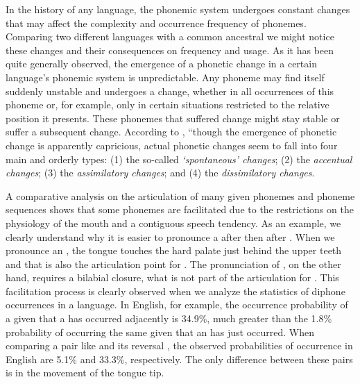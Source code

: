 In the history of any language, the phonemic system undergoes constant changes that may affect the complexity and occurrence frequency of phonemes. Comparing two different languages with a common ancestral we might notice these changes and their consequences on frequency and usage. As it has been quite generally observed, the emergence of a phonetic change in a certain language's phonemic system is unpredictable. Any phoneme may find itself suddenly unstable and undergoes a change, whether in all occurrences of this phoneme or, for example, only in certain situations restricted to the relative position it presents. These phonemes that suffered change might stay stable or suffer a subsequent change.	According to \cite{zipf1949}, ``though the emergence of phonetic change is apparently capricious, actual phonetic changes seem to fall into four main and orderly types: (1) the so-called \textit{`spontaneous' changes}; (2) the \textit{accentual changes}; (3) the \textit{assimilatory changes}; and (4) the \textit{dissimilatory changes}.

A comparative analysis on the articulation of many given phonemes and phoneme sequences shows that some phonemes are facilitated due to the restrictions on the physiology of the mouth and a contiguous speech tendency. As an example, we clearly understand why it is easier to pronounce a \textipa{[d]} after \textipa{[n]} then after \textipa{[m]}. When we pronounce an \textipa{[n]}, the tongue touches the hard palate just behind the upper teeth and that is also the articulation point for \textipa{[d]}. The pronunciation of \textipa{[m]}, on the other hand, requires a bilabial closure, what is not part of the articulation for \textipa{[d]}. This facilitation process is clearly observed when we analyze the statistics of diphone occurrences in a language. In English, for example, the occurrence probability of a \textipa{[d]} given that a \textipa{[n]} has occurred adjacently is 34.9\%, much greater than the 1.8\% probability of occurring the same \textipa{[d]} given that an \textipa{[m]} has just occurred. When comparing a pair like \textipa{[ts]} and its reversal \textipa{[st]}, the observed probabilities of occurrence in English are 5.1\% and 33.3\%, respectively. The only difference between these pairs is in the movement of the tongue tip.

